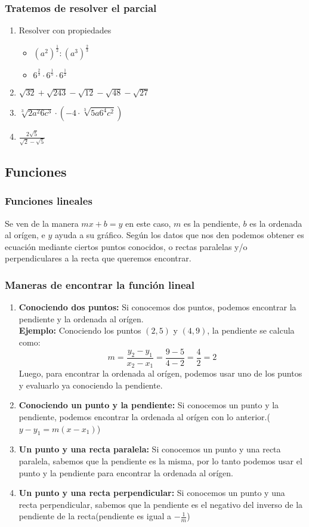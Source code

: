 \documentclass[a4paper]{article}
\begin{document}
\subsubsection{Tratemos de resolver el parcial}
\begin{enumerate}
    \item Resolver con propiedades
    \begin{itemize}
        \item $(a^2)^{\frac{1}{2}}:(a^3)^{\frac{2}{3}}$
        \item $6^{\frac{2}{3}}\cdot 6^{\frac{1}{5}} \cdot 6^{\frac{1}{2}}$
    \end{itemize}
    \item $\sqrt{32}+\sqrt{243}-\sqrt{12}-\sqrt{48}-\sqrt{27}$
    \item $\sqrt[3]{2a^2 6c^3} \cdot (-4\cdot \sqrt[3]{5a6^4c^2})$
    \item $\frac{2\sqrt{5}}{\sqrt{2}-\sqrt{5}}$
\end{enumerate}
\subsection{Funciones}
\subsubsection{Funciones lineales}
Se ven de la manera $mx+b=y$ en este caso, $m$ es la pendiente, $b$ es la ordenada al orígen, e $y$ ayuda a su gráfico. Según los datos que nos den podemos obtener es ecuación mediante ciertos puntos conocidos, o rectas paralelas y/o perpendiculares a la recta que queremos encontrar.
\subsubsection{Maneras de encontrar la función lineal}
\begin{enumerate}
    \item \textbf{Conociendo dos puntos:} Si conocemos dos puntos, podemos encontrar la pendiente y la ordenada al orígen.\\
    \textbf{Ejemplo:} Conociendo los puntos $(2,5)$ y $(4,9)$, la pendiente se calcula como:
    \[
        m=\frac{y_2-y_1}{x_2-x_1}=\frac{9-5}{4-2}=\frac{4}{2}=2
    \]
    Luego, para encontrar la ordenada al orígen, podemos usar uno de los puntos y evaluarlo ya conociendo la pendiente.
    \item \textbf{Conociendo un punto y la pendiente:} Si conocemos un punto y la pendiente, podemos encontrar la ordenada al orígen con lo anterior.($y-y_1=m(x-x_1)$)
    \item \textbf{Un punto y una recta paralela:} Si conocemos un punto y una recta paralela, sabemos que la pendiente es la misma, por lo tanto podemos usar el punto y la pendiente para encontrar la ordenada al orígen.
    \item \textbf{Un punto y una recta perpendicular:} Si conocemos un punto y una recta perpendicular, sabemos que la pendiente es el negativo del inverso de la pendiente de la recta(pendiente es igual a $-\frac{1}{m}$)
\end{enumerate}
\end{document}
